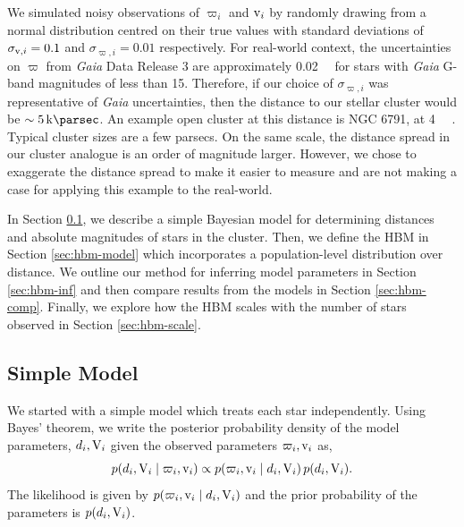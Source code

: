 We simulated noisy observations of \(\varpi_i\) and \(\mathrm{v}_i\) by randomly drawing from a normal distribution centred on their true values with standard deviations of \(\sigma_{\mathrm{v},i} = 0.1\) and \(\sigma_{\varpi,i} = 0.01\) respectively. 
For real-world context, the uncertainties on \(\varpi\) from \emph{Gaia} Data Release 3 \citep[DR3;][]{GaiaCollaboration.Vallenari.ea2022} are approximately \SI{0.02}{\milli\aarcsec} for stars with \emph{Gaia} G-band magnitudes of less than 15. Therefore, if our choice of \(\sigma_{\varpi,i}\) was representative of \emph{Gaia} uncertainties, then the distance to our stellar cluster would be \(\sim \SI{5}{\kilo\parsec}\). An example open cluster at this distance is NGC 6791, at \SI{4}{\kilo\parsec} \citep{Brogaard.Bruntt.ea2011}. Typical cluster sizes are a few parsecs. On the same scale, the distance spread in our cluster analogue is an order of magnitude larger. However, we chose to exaggerate the distance spread to make it easier to measure and are not making a case for applying this example to the real-world.

In Section \ref{sec:simple-model}, we describe a simple Bayesian model for determining distances and absolute magnitudes of stars in the cluster. Then, we define the HBM in Section \ref{sec:hbm-model} which incorporates a population-level distribution over distance. We outline our method for inferring model parameters in Section \ref{sec:hbm-inf} and then compare results from the models in Section \ref{sec:hbm-comp}. Finally, we explore how the HBM scales with the number of stars observed in Section \ref{sec:hbm-scale}.

\subsection{Simple Model}\label{sec:simple-model}

We started with a simple model which treats each star independently. Using Bayes' theorem, we write the posterior probability density of the model parameters, \(d_i, \mathrm{V}_i\) given the observed parameters \(\varpi_i, \mathrm{v}_i\) as,
%
\begin{equation}
    p(d_i, \mathrm{V}_i \mid \varpi_i, \mathrm{v}_i) \propto p(\varpi_i, \mathrm{v}_i \mid d_i, \mathrm{V}_i) \, p(d_i, \mathrm{V}_i).
\end{equation}
%
The likelihood is given by \(p(\varpi_i, \mathrm{v}_i \mid d_i, \mathrm{V}_i)\) and the prior probability of the parameters is \(p(d_i, \mathrm{V}_i)\).

